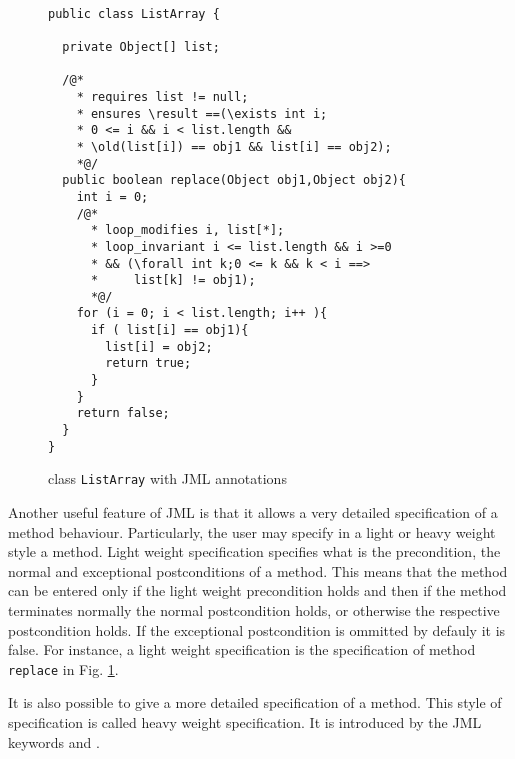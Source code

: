 \begin{figure}[ht!]
\begin{lstlisting}[frame=trbl] 

public class ListArray {

  private Object[] list;

  /@*
    * requires list != null;
    * ensures \result ==(\exists int i; 
    * 0 <= i && i < list.length && 
    * \old(list[i]) == obj1 && list[i] == obj2);
    *@/
  public boolean replace(Object obj1,Object obj2){
    int i = 0;
    /@*
      * loop_modifies i, list[*];
      * loop_invariant i <= list.length && i >=0 
      * && (\forall int k;0 <= k && k < i ==> 
      *     list[k] != obj1);
      *@/
    for (i = 0; i < list.length; i++ ){
      if ( list[i] == obj1){
        list[i] = obj2;
        return true;	
      }
    }
    return false;
  }
}
\end{lstlisting}
\caption{\sc class \mbox{\rm \lstinline!ListArray!} with JML annotations} 
\label{replaceSrc}
\end{figure}



Another useful feature of JML is that it allows a very detailed specification of
a method behaviour. Particularly, the user may specify in a light or heavy weight style a method.
Light weight specification specifies what is the precondition, the normal and exceptional postconditions
of a method. This means that the method can be entered only if the light weight precondition holds and then if the method terminates
normally the normal postcondition holds, or otherwise the respective postcondition holds. If the exceptional postcondition is ommitted by defauly
it is false. For instance, a light weight specification is the specification of method  \texttt{replace}  in Fig. \ref{replaceSrc}.

It is also possible to give a more detailed specification of a method. This style of specification is called heavy weight specification.
 It is introduced by the JML keywords  and . 
